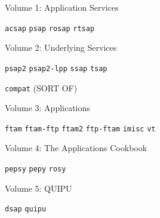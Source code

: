 \begin{bwslide}

\begin{nrtc}
\item	Volume 1: Application Services\\
    \begin{nrtc}
    \item	\verb"acsap" \verb"psap" \verb"rosap" \verb"rtsap" 
    \end{nrtc}

\item	Volume 2: Underlying Services\\
    \begin{nrtc}
    \item	\verb"psap2" \verb"psap2-lpp" \verb"ssap" \verb"tsap"

    \item	\verb"compat" (SORT OF)
    \end{nrtc}

\item	Volume 3: Applications\\
    \begin{nrtc}
    \item	\verb"ftam" \verb"ftam-ftp" \verb"ftam2" \verb"ftp-ftam"
		\verb"imisc" \verb"vt"
    \end{nrtc}

\item	Volume 4: The Applications Cookbook\\
    \begin{nrtc}
    \item	\verb"pepsy" \verb"pepy" \verb"rosy"
    \end{nrtc}

\item	Volume 5: QUIPU\\
    \begin{nrtc}
    \item	\verb"dsap" \verb"quipu"
    \end{nrtc}
\end{nrtc}
\end{bwslide}



